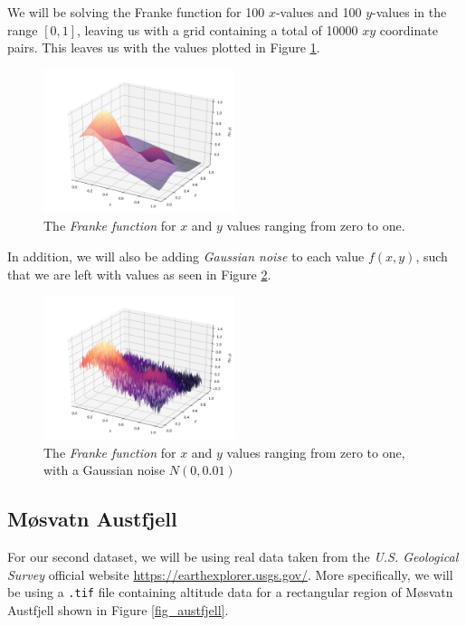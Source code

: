 \documentclass[a4paper,10pt,english]{article}
\begin{document}
We will be solving the Franke function for 100 $x$-values and 100 $y$-values in the range $[0,1]$, leaving us with a grid containing a total of 10000 $xy$ coordinate pairs.  This leaves us with the values plotted in Figure \ref{fig_Franke}.

\begin{figure}[H]
	\centering
	\includegraphics[width = 0.5\textwidth, center]{Franke.png}
	\caption{The \textit{Franke function} for $x$ and $y$ values ranging from zero to one. \label{fig_Franke}}
\end{figure}


In addition, we will also be adding \textit{Gaussian noise} to each value $f(x,y)$, such that we are left with values as seen in Figure \ref{fig_Franke_noise}.

\begin{figure}[H]
	\centering
	\includegraphics[width = 0.5\textwidth, center]{Franke_noise.png}
	\caption{The \textit{Franke function} for $x$ and $y$ values ranging from zero to one, with a Gaussian noise $N(0,0.01)$\label{fig_Franke_noise}}
\end{figure}

\subsection*{Møsvatn Austfjell}

For our second dataset, we will be using real data taken from the \textit{U.S. Geological Survey} \cite{earthexplorer} official website \url{https://earthexplorer.usgs.gov/}.  More specifically, we will be using a \texttt{.tif} file containing altitude data for a rectangular region of Møsvatn Austfjell shown in Figure \ref{fig_austfjell}.
\end{document}
